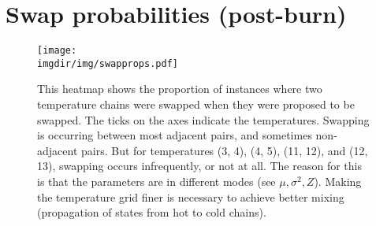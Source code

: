 \documentclass[10pt]{article} %
\def\imgdir{../../results/test-sim-6-7-5/maxtemp1.05-ntemps20-degree1-N2000}
\begin{document}
\section{Swap probabilities (post-burn)}
\begin{figure}[H]
  \centering
  \texttt{[image: \\imgdir/img/swapprops.pdf]}
  \caption{This heatmap shows the proportion of instances where two
  temperature chains were swapped when they were proposed to be swapped. The
  ticks on the axes indicate the temperatures. Swapping is occurring between
  most adjacent pairs, and sometimes non-adjacent pairs. But for temperatures
  (3, 4), (4, 5), (11, 12), and (12, 13), swapping occurs infrequently,
  or not at all. The reason for this is that the parameters are in different
  modes (see $\mu, \sigma^2, Z$). Making the temperature grid finer is
  necessary to achieve better mixing (propagation of states from hot to cold
  chains).}
\end{figure}

\newpage
\end{document}
